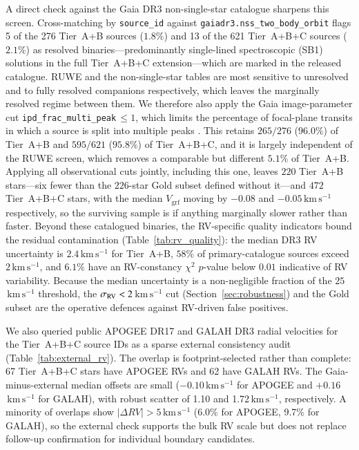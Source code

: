 \documentclass{aa}  %
\newcommand{\vgrf}{\ensuremath{V_{\mathrm{grf}}}\xspace}
\newcommand{\kms}{\ensuremath{\,\mathrm{km\,s^{-1}}}\xspace}
\begin{document}
A direct check against the Gaia DR3 non-single-star catalogue sharpens
this screen.  Cross-matching by \texttt{source\_id} against
\texttt{gaiadr3.nss\_two\_body\_orbit} flags 5 of the 276 Tier~A+B
sources ($1.8\%$) and 13 of the 621 Tier~A+B+C sources ($2.1\%$) as
resolved binaries---predominantly single-lined spectroscopic (SB1)
solutions in the full Tier~A+B+C extension---which are marked in the
released catalogue.  RUWE and the non-single-star tables are most
sensitive to unresolved and to fully resolved companions respectively,
which leaves the marginally resolved regime between them.  We therefore
also apply the Gaia image-parameter cut
\texttt{ipd\_frac\_multi\_peak}$\,\leq 1$, which limits the percentage of
focal-plane transits in which a source is split into multiple peaks
\citep[][adopt a threshold of 2]{Banik2026,Pace2022}.  This retains
$265/276$ ($96.0\%$) of Tier~A+B and $595/621$ ($95.8\%$) of
Tier~A+B+C, and it is largely independent of the RUWE screen, which
removes a comparable but different $5.1\%$ of Tier~A+B.  Applying all
observational cuts jointly, including this one, leaves $220$ Tier~A+B
stars---six fewer than the $226$-star Gold subset defined without
it---and $472$ Tier~A+B+C stars, with the median \vgrf{} moving by
$-0.08$ and $-0.05\kms$ respectively, so the surviving sample is if
anything marginally slower rather than faster.  Beyond these
catalogued binaries, the RV-specific quality indicators bound the residual
contamination (Table~\ref{tab:rv_quality}): the median DR3 RV uncertainty
is $2.4$\kms{} for Tier~A+B, $58\%$ of primary-catalogue sources exceed $2$\kms,
and $6.1\%$ have an RV-constancy $\chi^2$ $p$-value below $0.01$
indicative of RV variability.  Because the median uncertainty is a
non-negligible fraction of the $25$\kms{} threshold, the
$\sigma_{\rm RV}<2$\kms{} cut (Section~\ref{sec:robustness}) and the Gold
subset are the operative defences against RV-driven false positives.

We also queried public APOGEE DR17 and GALAH DR3 radial velocities for
the Tier~A+B+C source IDs as a sparse external consistency audit
(Table~\ref{tab:external_rv}).  The overlap is footprint-selected rather
than complete: 67 Tier~A+B+C stars have APOGEE RVs and 62 have GALAH RVs.
The Gaia-minus-external median offsets are small ($-0.10$\kms{} for
APOGEE and $+0.16$\kms{} for GALAH), with robust scatter of 1.10 and
1.72\kms, respectively.  A minority of overlaps show
$|\Delta RV|>5$\kms{} (6.0\% for APOGEE, 9.7\% for GALAH), so the external
check supports the bulk RV scale but does not replace follow-up
confirmation for individual boundary candidates.
\end{document}
